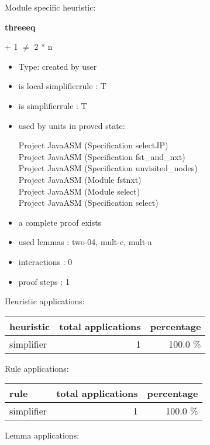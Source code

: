 \documentclass[a4paper]{article}
\begin{document}
Module specific heuristic:

\pagebreak

{\LARGE\bf threeeq}\label{lemma-threeeq}

\medskip

  + 1 $\neq$ 2 $*$ n

\begin{itemize}

\item Type: created by user

\item is local simplifierrule : T
\item is simplifierrule : T
\item used by units in proved state:

Project JavaASM (Specification selectJP) \\
Project JavaASM (Specification fst\_and\_nxt) \\
Project JavaASM (Specification unvisited\_nodes) \\
Project JavaASM (Module fstnxt) \\
Project JavaASM (Module select) \\
Project JavaASM (Specification select)
\item       a complete proof exists
\item       used lemmas  : two-04, mult-c, mult-a
\item       interactions : 0
\item       proof steps  : 1
\end{itemize}

\medskip


Heuristic applications:

\begin{supertabular}{l|r|r}
heuristic	& total applications & percentage \\ \hline
simplifier & 1 & 100.0 \% \\

\end{supertabular}

Rule applications:

\begin{supertabular}{l|r|r}
rule	        & total applications & percentage \\ \hline
simplifier & 1 & 100.0 \% \\

\end{supertabular}

Lemma applications:
\end{document}
